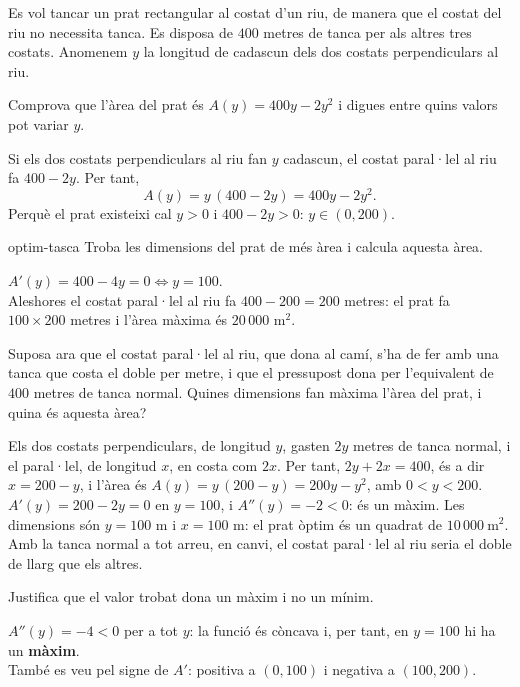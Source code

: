 Es vol tancar un prat rectangular al costat d'un riu, de manera que el costat del riu no
necessita tanca. Es disposa de $400$ metres de tanca per als altres tres costats. Anomenem $y$
la longitud de cadascun dels dos costats perpendiculars al riu.

\begin{apartats}

Comprova que l'àrea del prat és $A(y)=400y-2y^2$ i digues entre quins valors pot variar $y$.

\begin{solucio}
Si els dos costats perpendiculars al riu fan $y$ cadascun, el costat paral·lel al riu fa
$400-2y$. Per tant,
\[
A(y)=y\,(400-2y)=400y-2y^2 .
\]
Perquè el prat existeixi cal $y>0$ i $400-2y>0$: $y\in(0,200)$.
\end{solucio}

\begin{tria}{optim-tasca}
Troba les dimensions del prat de més àrea i calcula aquesta àrea.

\begin{solucio}
$A'(y)=400-4y=0\iff y=100$.\\
Aleshores el costat paral·lel al riu fa $400-200=200$ metres: el prat fa
$\boxed{100\times200}$ metres i l'àrea màxima és $\boxed{20\,000}$ m$^2$.
\end{solucio}

Suposa ara que el costat paral·lel al riu, que dona al camí, s'ha de fer amb una tanca que costa
el doble per metre, i que el pressupost dona per l'equivalent de $400$ metres de tanca normal.
Quines dimensions fan màxima l'àrea del prat, i quina és aquesta àrea?

\begin{solucio}
Els dos costats perpendiculars, de longitud $y$, gasten $2y$ metres de tanca normal, i el
paral·lel, de longitud $x$, en costa com $2x$. Per tant, $2y+2x=400$, és a dir $x=200-y$, i
l'àrea és $A(y)=y\,(200-y)=200y-y^2$, amb $0<y<200$.\\
$A'(y)=200-2y=0$ en $y=100$, i $A''(y)=-2<0$: és un màxim. Les dimensions són $y=100$ m i
$x=100$ m: el prat òptim és un quadrat de $10\,000\ \text{m}^2$. Amb la tanca normal a tot arreu,
en canvi, el costat paral·lel al riu seria el doble de llarg que els altres.
\end{solucio}
\end{tria}

\begin{nomesllarg}
Justifica que el valor trobat dona un màxim i no un mínim.

\begin{solucio}
$A''(y)=-4<0$ per a tot $y$: la funció és còncava i, per tant, en $y=100$ hi ha un
\textbf{màxim}.\\
També es veu pel signe de $A'$: positiva a $(0,100)$ i negativa a $(100,200)$.
\end{solucio}
\end{nomesllarg}

\end{apartats}
